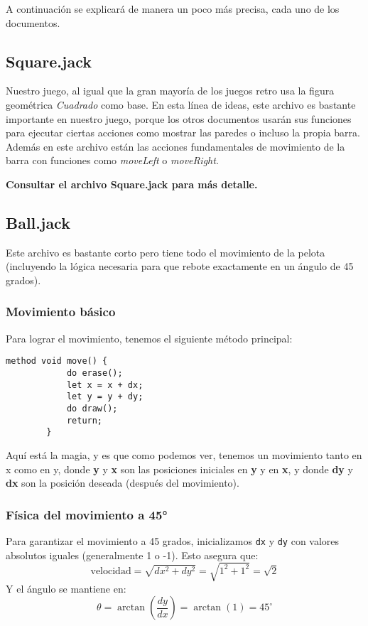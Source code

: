 \documentclass[twocolumn]{article}
\begin{document}
	A continuación se explicará de manera un poco más precisa, cada uno de los documentos.
	
	\subsection{Square.jack}
	Nuestro juego, al igual que la gran mayoría de los juegos retro usa la figura geométrica \emph{Cuadrado} como base. En esta línea de ideas, este archivo es bastante importante en nuestro juego, porque los otros documentos usarán sus funciones para ejecutar ciertas acciones como mostrar las paredes o incluso la propia barra. Además en este archivo están las acciones fundamentales de movimiento de la barra con funciones como \emph{moveLeft} o \emph{moveRight}.  
	
	\textbf{Consultar el archivo Square.jack para más detalle.}
	
	\subsection{Ball.jack}
	Este archivo es bastante corto pero tiene todo el movimiento de la pelota (incluyendo la lógica necesaria para que rebote exactamente en un ángulo de 45 grados). 
	
	\subsubsection{Movimiento básico}
	Para lograr el movimiento, tenemos el siguiente método principal:
	
	\begin{lstlisting}[caption=Método move() de la pelota]
		method void move() {
			do erase();
			let x = x + dx;
			let y = y + dy;
			do draw();
			return;
		}
	\end{lstlisting}
	
	Aquí está la magia, y es que como podemos ver, tenemos un movimiento tanto en x como en y, donde \textbf{y} y \textbf{x} son las posiciones iniciales en \textbf{y} y en \textbf{x}, y donde \textbf{dy} y \textbf{dx} son la posición deseada (después del movimiento). 
	
	\subsubsection{Física del movimiento a 45°}
	Para garantizar el movimiento a 45 grados, inicializamos \texttt{dx} y \texttt{dy} con valores absolutos iguales (generalmente 1 o -1). Esto asegura que:
	\[
	\text{velocidad} = \sqrt{dx^2 + dy^2} = \sqrt{1^2 + 1^2} = \sqrt{2}
	\]
	Y el ángulo se mantiene en:
	\[
	\theta = \arctan\left(\frac{dy}{dx}\right) = \arctan(1) = 45^\circ
	\]
	
\end{document}
